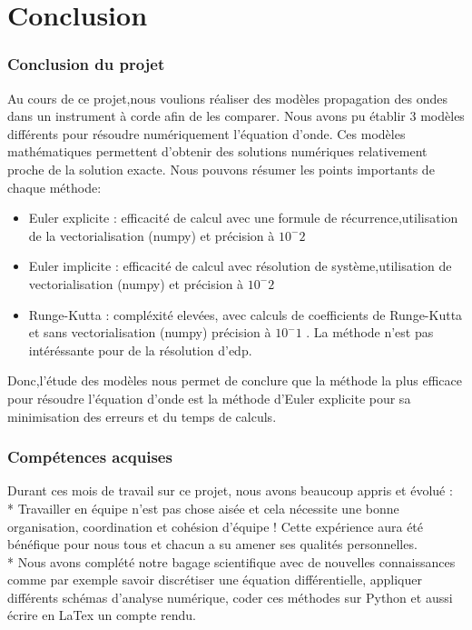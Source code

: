 \part{Conclusion}

\section{Conclusion du projet}
Au cours de ce projet,nous voulions réaliser des modèles propagation des ondes dans un instrument à corde afin de les comparer. Nous avons pu établir 3 modèles différents pour résoudre numériquement l'équation d'onde. Ces modèles mathématiques permettent d'obtenir des solutions numériques relativement proche de la solution exacte.
Nous pouvons résumer les points importants de chaque méthode:
\begin{itemize}
    \item Euler explicite : efficacité de calcul avec une formule de récurrence,utilisation de la vectorialisation (numpy) et précision à $10^-2$
    \item Euler implicite : efficacité de calcul avec résolution de système,utilisation de vectorialisation (numpy) et précision à $10^-2$
    \item Runge-Kutta : compléxité elevées, avec calculs de coefficients de Runge-Kutta et sans vectorialisation (numpy) précision à $10^-1$ . La méthode n'est pas intéréssante pour de la résolution d'edp.
\end{itemize}
Donc,l'étude des modèles nous permet de conclure que la méthode la plus efficace pour résoudre l'équation d'onde est la méthode d'Euler explicite pour sa minimisation des erreurs et du temps de calculs.
\section{Compétences acquises}

Durant ces mois de travail sur ce projet, nous avons beaucoup appris et évolué :\\ 

* Travailler en équipe n'est pas chose aisée et cela nécessite une bonne organisation, coordination et cohésion d'équipe ! Cette expérience aura été bénéfique pour nous tous et chacun a su amener ses qualités personnelles.\\

* Nous avons complété notre bagage scientifique avec de nouvelles connaissances comme par exemple savoir discrétiser une équation différentielle, appliquer différents schémas d'analyse numérique, coder ces méthodes sur Python et aussi écrire en LaTex un compte rendu.